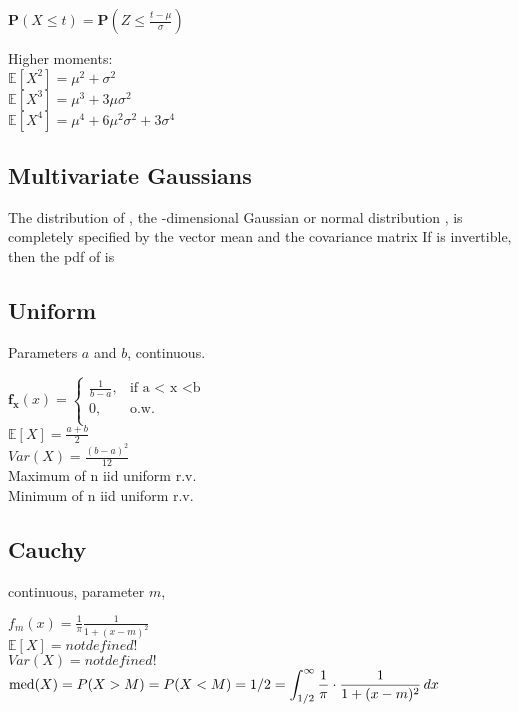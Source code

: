 $\mathbf{P}\left(X\leq t\right) = \displaystyle \mathbf{P}\left(Z\leq \frac{t-\mu}{\sigma}\right)$

Higher moments:\\

$\mathbb{E}[X^2] = \mu^2 + \sigma^2$\\
$\mathbb{E}[X^3] = \mu^3 + 3\mu\sigma^2$\\
$\mathbb{E}[X^4] = \mu^4 + 6\mu^2\sigma^2 +3\sigma^4$\\

\subsection*{Multivariate Gaussians}

The distribution of , the -dimensional Gaussian or normal distribution , is completely specified by the vector mean  and the  covariance matrix  If  is invertible, then the pdf of  is

\subsection*{Uniform}

Parameters $a$ and $b$, continuous.

$ \mathbf{f_x}(x)=
	\begin{cases}
		 \frac{1}{b-a},&\text{if a < x <b}\\
		0,&\text{o.w.}\\
	\end{cases}
$\\

$\mathbb{E}[X]=\frac{a+b}{2}$\\
$Var(X)=\frac{(b-a)^2}{12}$\\

Maximum of n iid uniform r.v.\\

Minimum of n iid uniform r.v.\\

\subsection*{Cauchy}
continuous, parameter $m$,

$f_ m(x) = \frac{1}{\pi } \frac{1}{1 + (x - m)^2}$\\

$\mathbb{E}[X]=not defined!$\\
$Var(X)=not defined!$\\

$\text {med}(X) = P(X > M) = P(X < M)\\ = 1/2 = \displaystyle \int _{1/2}^{\infty } \frac{1}{\pi } \cdot \frac{1}{1 + (x-m)^2} \,  dx$